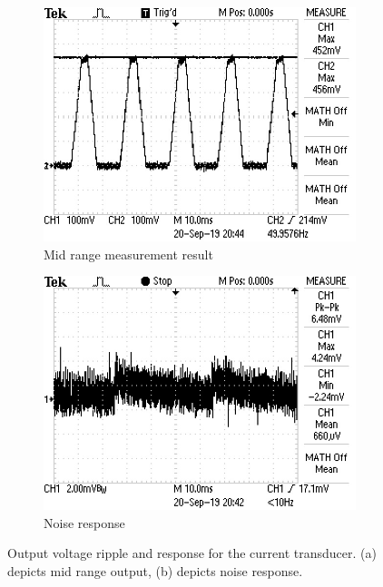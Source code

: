 \begin{figure}[h]
 \centering
     \begin{subfigure}[]{0.45\textwidth}
        \centering
         \includegraphics[width=1\linewidth]{./Figures/currenttransducermidrange.JPG}
		    \caption{Mid range measurement result} \label{subfig:currenttransducermidrange}
     \end{subfigure}
      \begin{subfigure}[]{0.45\textwidth}
              \centering
  		\includegraphics[width=1\linewidth]{./Figures/currenttransducernoise.JPG}
		    \caption{Noise response} \label{subfig:currenttransducermidrangenoise}
     \end{subfigure}
   \caption[Measured results for the current transducer]{Output voltage ripple and response for the current transducer. (a) depicts mid range output, (b) depicts noise response. }
    \label{fig:current_simulation_results_box_real}
 \end{figure}





